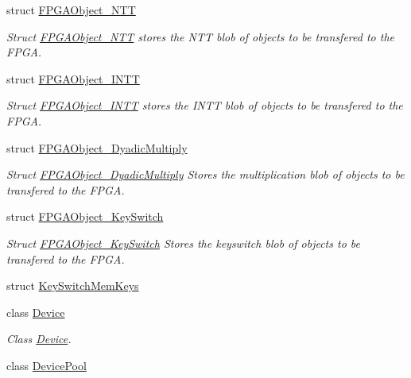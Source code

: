 \begin{DoxyCompactItemize}
struct \hyperlink{structintel_1_1hexl_1_1fpga_1_1FPGAObject__NTT}{F\-P\-G\-A\-Object\-\_\-\-N\-T\-T}
\begin{DoxyCompactList}\small\item\em Struct \hyperlink{structintel_1_1hexl_1_1fpga_1_1FPGAObject__NTT}{F\-P\-G\-A\-Object\-\_\-\-N\-T\-T} stores the N\-T\-T blob of objects to be transfered to the F\-P\-G\-A. \end{DoxyCompactList}\item 
struct \hyperlink{structintel_1_1hexl_1_1fpga_1_1FPGAObject__INTT}{F\-P\-G\-A\-Object\-\_\-\-I\-N\-T\-T}
\begin{DoxyCompactList}\small\item\em Struct \hyperlink{structintel_1_1hexl_1_1fpga_1_1FPGAObject__INTT}{F\-P\-G\-A\-Object\-\_\-\-I\-N\-T\-T} stores the I\-N\-T\-T blob of objects to be transfered to the F\-P\-G\-A. \end{DoxyCompactList}\item 
struct \hyperlink{structintel_1_1hexl_1_1fpga_1_1FPGAObject__DyadicMultiply}{F\-P\-G\-A\-Object\-\_\-\-Dyadic\-Multiply}
\begin{DoxyCompactList}\small\item\em Struct \hyperlink{structintel_1_1hexl_1_1fpga_1_1FPGAObject__DyadicMultiply}{F\-P\-G\-A\-Object\-\_\-\-Dyadic\-Multiply} Stores the multiplication blob of objects to be transfered to the F\-P\-G\-A. \end{DoxyCompactList}\item 
struct \hyperlink{structintel_1_1hexl_1_1fpga_1_1FPGAObject__KeySwitch}{F\-P\-G\-A\-Object\-\_\-\-Key\-Switch}
\begin{DoxyCompactList}\small\item\em Struct \hyperlink{structintel_1_1hexl_1_1fpga_1_1FPGAObject__KeySwitch}{F\-P\-G\-A\-Object\-\_\-\-Key\-Switch} Stores the keyswitch blob of objects to be transfered to the F\-P\-G\-A. \end{DoxyCompactList}\item 
struct \hyperlink{structintel_1_1hexl_1_1fpga_1_1KeySwitchMemKeys}{Key\-Switch\-Mem\-Keys}
\item 
class \hyperlink{classintel_1_1hexl_1_1fpga_1_1Device}{Device}
\begin{DoxyCompactList}\small\item\em Class \hyperlink{classintel_1_1hexl_1_1fpga_1_1Device}{Device}. \end{DoxyCompactList}\item 
class \hyperlink{classintel_1_1hexl_1_1fpga_1_1DevicePool}{Device\-Pool}

\end{DoxyCompactItemize}
